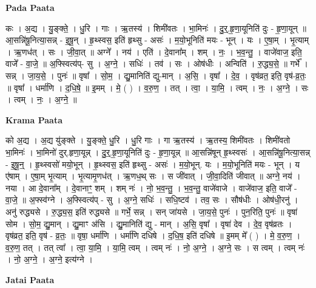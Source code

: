 \documentclass[17pt]{extarticle}
\begin{document}
\textbf{Pada Paata} \newline

कः । अ॒द्य । यु॒ङ्क्ते॒ । धु॒रि । गाः । ऋ॒तस्य॑ । शिमी॑वतः । भा॒मिनः॑ । दु॒र्॒.हृ॒णा॒यूनिति॑ दुः - हृ॒णा॒यून् ॥ आ॒सन्नि॑षू॒नित्या॒सन्न् - इ॒षू॒न् । हृ॒थ्स्वस॒ इति॑ हृथ्सु - असः॑ । म॒यो॒भूनिति॑ मयः - भून् । यः । ए॒षा॒म् । भृ॒त्याम् । ऋ॒णध॑त् । सः । जी॒वा॒त् ॥ अग्ने᳚ । नय॑ । एति॑ । दे॒वाना᳚म् । शम् । नः॒ । भ॒व॒न्तु॒ । वाजे॑वाज॒ इति॒ वाजे᳚ - वा॒जे॒ ॥ अ॒फ्स्वित्य॑प्- सु । अ॒ग्ने॒ । सधिः॑ । तव॑ । सः । ओष॑धीः । अन्विति॑ । रु॒द्ध्य॒से॒ ॥ गर्भे᳚ । सन्न् । जा॒य॒से॒ । पुनः॑ ॥ वृषा᳚ । सो॒म॒ । द्यु॒मानिति॑ द्यु-मान् । अ॒सि॒ । वृषा᳚ । दे॒व॒ । वृष॑व्रत॒ इति॒ वृष॑-व्र॒तः॒ ॥ वृषा᳚ । धर्मा॑णि । द॒धि॒षे॒ ॥ इ॒मम् । मे॒ ( ) । व॒रु॒ण॒ । तत् । त्वा॒ । या॒मि॒ । त्वम् । नः॒ । अ॒ग्ने॒ । सः । त्वम् । नः॒ । अ॒ग्ने॒ ॥  \newline


\textbf{Krama Paata} \newline

को अ॒द्य । अ॒द्य यु॑ङ्क्ते । यु॒ङ्क्ते॒ धु॒रि । धु॒रि गाः । गा ऋ॒तस्य॑ । ऋ॒तस्य॒ शिमी॑वतः । शिमी॑वतो भा॒मिनः॑ । भा॒मिनो॑ दुर्.हृणा॒यून्न् । दु॒र्॒.हृ॒णा॒यूनिति॑ दुः - हृ॒णा॒यून्न् ॥ आ॒सन्नि॑षून् हृ॒थ्स्वसः॑ । आ॒सन्नि॑षू॒नित्या॒सन्न् - इ॒षू॒न्॒ । हृ॒थ्स्वसो॑ मयो॒भून् । हृ॒थ्स्वस॒ इति॑ हृथ्सु - असः॑ । म॒यो॒भून्. यः । म॒यो॒भूनिति॑ मयः - भून् । य ए॑षाम् । ए॒षा॒म् भृ॒त्याम् । भृ॒त्यामृ॒णध॑त् । ऋ॒णध॒थ् सः । स जी॑वात् । जी॒वा॒दिति॑ जीवात् ॥ अग्ने॒ नय॑ । नया । आ दे॒वाना᳚म् । दे॒वानाꣳ॒॒ शम् । शम् नः॑ । नो॒ भ॒व॒न्तु॒ । भ॒व॒न्तु॒ वाजे॑वाजे । वाजे॑वाज॒ इति॒ वाजे᳚ - वा॒जे॒ ॥ अ॒फ्स्व॑ग्ने । अ॒फ्स्वित्य॑प् - सु । अ॒ग्ने॒ सधिः॑ । सधि॒ष्टव॑ । तव॒ सः । सौष॑धीः । ओष॑धी॒रनु॑ । अनु॑ रुद्ध्यसे । रु॒द्ध्य॒स॒ इति॑ रुद्ध्यसे ॥ गर्भे॒ सन्न् । सन् जा॑यसे । जा॒य॒से॒ पुनः॑ । पुन॒रिति॒ पुनः॑ ॥ वृषा॑ सोम । सो॒म॒ द्यु॒मान् । द्यु॒माꣳ अ॑सि । द्यु॒मानिति॑ द्यु - मान् । अ॒सि॒ वृषा᳚ । वृषा॑ देव । दे॒व॒ वृष॑व्रतः । वृष॑व्रत॒ इति॒ वृष॑ - व्र॒तः॒ ॥ वृषा॒ धर्मा॑णि । धर्मा॑णि दधिषे । द॒धि॒ष॒ इति॑ दधिषे ॥ इ॒मम् मे᳚ ( ) । मे॒ व॒रु॒ण॒ । व॒रु॒ण॒ तत् । तत् त्वा᳚ । त्वा॒ या॒मि॒ । या॒मि॒ त्वम् । त्वम् नः॑ । नो॒ अ॒ग्ने॒ । अ॒ग्ने॒ सः । स त्वम् । त्वम् नः॑ । नो॒ अ॒ग्ने॒ । अ॒ग्ने॒ इत्य॑ग्ने । \newline

\textbf{Jatai Paata} \newline
\end{document}
